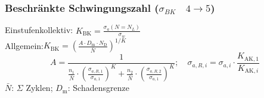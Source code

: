         \subsubsection{Beschränkte Schwingungszahl ($\sigma_{BK}\quad4\rightarrow5$)}
            Einstufenkollektiv: $\displaystyle K_{\textrm{BK}}= \frac{\sigma_{a}(N=N_L)}{\sigma_w}$\\
            Allgemein:\qquad\qquad $\displaystyle K_{\textrm{BK}}=\left(\frac{A\cdot D_{\textrm{m}}\cdot N_{\textrm{D}}}{\bar{N}}\right)^{1/K}$
            \vspace{-3mm}\[A = \frac{1}{\frac{n_1}{\bar{N}}\cdot\left(\frac{\sigma_{a,R,1}}{\sigma_{a,1}}\right)^{K}+\frac{n_2}{\bar{N}}\cdot\left(\frac{\sigma_{a,R,2}}{\sigma_{a,1}}\right)^{K}};\quad \sigma_{a,R,i}=\sigma_{a,i}\cdot\frac{K_{\textrm{AK},1}}{K_{\textrm{AK},i}}\]
            $\bar{N}$: $\Sigma$ Zyklen; \qquad $D_{\textrm{m}}$: Schadensgrenze